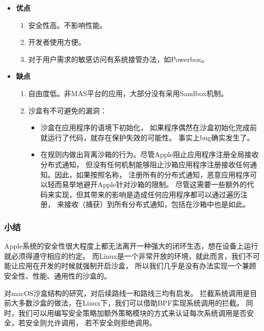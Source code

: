 \documentclass[AutoFakeBold,a4paper]{ctexart}
\begin{document}
\begin{itemize}
    \item \textbf{优点}
    \begin{enumerate}
        \item 安全性高。不影响性能。
        \item 开发者使用方便。
        \item 对于用户需求的敏感访问有系统接管办法，如Powerbox。
    \end{enumerate}
    \item \textbf{缺点}
    \begin{enumerate}
        \item 自由度低。非MAS平台的应用，大部分没有采用Sandbox机制。
        \item 沙盒有不可避免的漏洞：
        \begin{itemize}
            \item 沙盒在应用程序的语境下初始化，
            如果程序偶然在沙盒初始化完成前就运行了代码，就存在保护失效的可能性。 
            事实上bug确实发生了。\cite{blochberger2019state}
            \item 在规则内做出背离沙箱的行为。\cite{Mojave2018}尽管Apple阻止应用程序注册全局接收分布式通知，
            但没有任何机制能够阻止沙箱应用程序注册接收任何通知。因此，如果按照名称，
            注册所有的分布式通知，恶意应用程序可以轻而易举地避开Apple针对沙箱的限制。
            尽管这需要一些额外的代码来实现，但其带来的影响是造成任何应用程序都可以通过遍历注册，
            来接收（捕获）到所有分布式通知，包括在沙箱中也是如此。
        \end{itemize}
    \end{enumerate}
\end{itemize}

\subsubsection{小结}

Apple系统的安全性很大程度上都无法离开一种强大的闭环生态，想在设备上运行就必须得遵守相应的约定。
而Linux是一个非常开放的环境，就此而言，我们不可能让应用在开发的时候就强制开启沙盒，
所以我们几乎是没有办法实现一个兼顾安全性、性能、通用性的沙盒的。

对macOS沙盒结构的研究，对后续路线一和路线三均有启发。
拦截系统调用是目前大多数沙盒的做法，在Linux下，我们可以借助BPF实现系统调用的拦截。
同时，我们可以用编写安全策略加额外策略模块的方式来认证每次系统调用是否安全，若安全则允许调用，
若不安全则拒绝调用。
\end{document}
